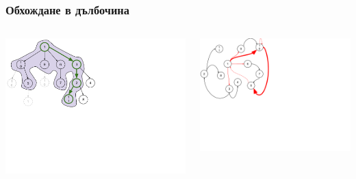 \documentclass{beamer}
\begin{document}
\begin{frame}[fragile]
\frametitle{Обхождане в дълбочина}
 
\begin{columns}[t]
  \begin{column}{0.55\textwidth}
    \includegraphics[width=12cm]{images/graph_dfs_2}
  \end{column}
  \begin{column}{0.45\textwidth}
  \includegraphics[width=10cm]{images/graph_dfs}
  \end{column}
\end{columns}

 

\end{frame}
\end{document}
